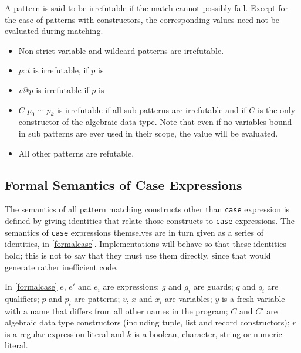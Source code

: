 A pattern is said to be irrefutable if the match cannot possibly fail. Except for the case of patterns with constructors, the corresponding values need not be evaluated during matching.

\begin{itemize}
\item Non-strict variable and wildcard patterns are irrefutable.
\item $p$::$t$ is irrefutable, if $p$ is
\item $v$@$p$ is irrefutable if $p$ is
\item $C$ $p_0$ $\cdots$ $p_k$ is irrefutable if all sub patterns are irrefutable and if $C$ is the only constructor of the algebraic data type. Note that even if no variables bound in sub patterns  are ever used in their scope, the value will be evaluated.
\item All other patterns are refutable.
\end{itemize}


\subsection{Formal Semantics of Case Expressions}

The semantics of all pattern matching constructs other than \texttt{case} expression is defined by giving identities that relate those constructs to \texttt{case} expressions. The semantics of \texttt{case} expressions themselves are in turn given as a series of identities, in \autoref{formalcase}. Implementations will behave so that these identities hold; this is not to say that they must use them directly, since that would generate rather inefficient code.

In \autoref{formalcase} $e$, $e'$ and $e_i$ are expressions; $g$ and $g_i$ are guards; $q$ and $q_i$ are qualifiers; $p$ and  $p_i$ are patterns; $v$, $x$ and $x_i$ are variables; $y$ is a fresh variable with a name that differs from all other names in the program; $C$ and $C'$ are algebraic data type constructors (including tuple, list and record constructors); $r$ is a regular expression literal and $k$ is a boolean, character, string or numeric literal.


